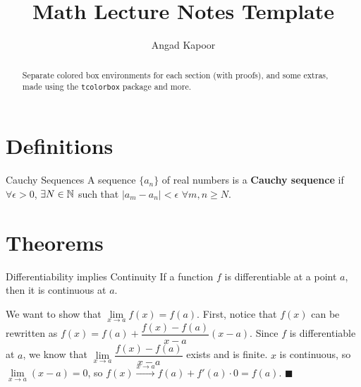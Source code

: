 \documentclass[a4paper,12pt]{article}
\title{\textbf{Math Lecture Notes Template}}
\author{Angad Kapoor}
\date{}
\begin{document}
\maketitle
\begin{abstract}
    Separate colored box environments for each section (with proofs), and some extras, made using the \verb|tcolorbox| package and more.
\end{abstract}
\tableofcontents

\linediv

\thispagestyle{empty}

\section{Definitions}
\begin{definition}{Cauchy Sequences}{}
    A sequence $\{a_n\}$ of real numbers is a \textbf{Cauchy sequence} if $\forall \epsilon > 0$, $\exists N\in\mathbb{N}$ such that $|a_m - a_n| < \epsilon$ $\forall m,n \geq N$.
\end{definition}

\section{Theorems}
\begin{theorem}{Differentiability implies Continuity}{}
    If a function $f$ is differentiable at a point $a$, then it is continuous at $a$.
\end{theorem}
\begin{tproof*}{}{}
    We want to show that $\lim\limits_{x\to a}f(x) = f(a)$. 
    First, notice that $f(x)$ can be rewritten as $f(x) = f(a) + \dfrac{f(x) - f(a)}{x-a}(x-a)$. 
    Since $f$ is differentiable at $a$, we know that $\lim\limits_{x\to a}\dfrac{f(x) - f(a)}{x-a}$ exists and is finite.
    $x$ is continuous, so $\lim\limits_{x\to a} (x-a) = 0$, so $f(x) \xrightarrow{x\to a} f(a) + f'(a)\cdot 0 = f(a)$. $\blacksquare$
\end{tproof*}
\end{document}
